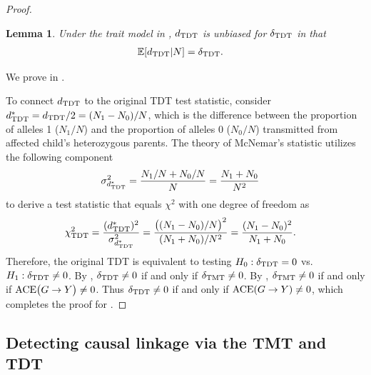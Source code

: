 \documentclass[12pt]{extarticle}
\newtheorem{asm}{Assumption}%
\newtheorem{lem}{Lemma}%
\newcommand{\pp}{\mathbb{P}}
\newcommand{\E}{\mathbb{E}}
\newcommand{\ace}{{\normalfont \text{ACE}}}
\newcommand{\tmt}{{\normalfont \text{TMT}}}
\newcommand{\tdt}{{\normalfont \text{TDT}}}
\begin{document}
{\begin{proof}
\begin{lem} \label{lem:tdt_ace} 
Under the trait model in , $d_{\tdt}$ is unbiased for $\delta_{\tdt}$ in that 
\begin{align*}
\E[d_{\tdt}|N] &= \delta_{\tdt}.
\end{align*}
\end{lem}

\noindent We prove  in . 

To connect $d_{\tdt}$ to the original TDT test statistic, consider $d^{\ast}_{\tdt}=d_{\tdt}/2=(N_1-N_0)/N$, which is the difference between the proportion of alleles 1 ($N_1/N$) and the proportion of alleles 0 ($N_0/N$) transmitted from affected child's heterozygous parents. The theory of McNemar's statistic \citep{mcnemar1947} utilizes the following component 
\begin{align*}
\sigma^2_{d^{\ast}_{\tdt}} &= \frac{N_1/N+N_0/N}{N} = \frac{N_1+N_0}{N^2}
\end{align*} to derive a test statistic that equals $\chi^2$ with one degree of freedom as 
\begin{align*}
\chi_{\text{TDT}}^2 &= \frac{(d^{\ast}_{\tdt})^2}{\sigma^2_{d^{\ast}_{\tdt}}}=\frac{\big((N_1-N_0)/N\big)^2}{(N_1+N_0)/N^2}=\frac{(N_1-N_0)^2}{N_1+N_0}.
\end{align*} Therefore, the original TDT is equivalent to testing $H_0: \delta_{\tdt}=0$ vs. $H_1: \delta_{\tdt}\neq 0$. By , $\delta_{\tdt}\neq 0$ if and only if $\delta_{\tmt}\neq 0$. By , $\delta_{\tmt}\neq 0$ if and only if $\ace \big(G \to Y\big)\neq 0$. Thus $\delta_{\tdt}\neq 0$ if and only if $\ace(G\to Y)\neq 0$, which completes the proof for .  \end{proof}

\subsection{Detecting causal linkage via the TMT and TDT} \label{sec:causal_linkage}

%

}
\end{document}
